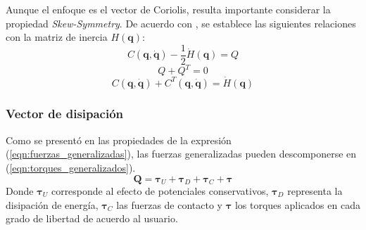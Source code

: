     Aunque el enfoque es el vector de Coriolis, resulta importante considerar la propiedad \emph{Skew-Symmetry}. De acuerdo con \cite{rigid_multibody},
    se establece las siguientes relaciones con la matriz de inercia $H(\boldsymbol{q})$:
    \begin{equation}
        \label{eqn:skew1}
        C(\boldsymbol{q}, \boldsymbol{\dot{q}}) - \frac{1}{2}\dot{H}(\boldsymbol{q}) = Q 
    \end{equation}
    \begin{equation}
        \label{eqn:skew2}
        Q + Q^T = 0
    \end{equation}
    \begin{equation}
        \label{eqn:skew3}
        C(\boldsymbol{q}, \boldsymbol{\dot{q}}) + C^T(\boldsymbol{q}, \boldsymbol{\dot{q}}) = \dot{H}(\boldsymbol{q})
    \end{equation}

    \subsubsection{Vector de disipación}
    Como se presentó en las propiedades de la expresión (\ref{eqn:fuerzas_generalizadas}), las fuerzas generalizadas pueden descomponerse en (\ref{eqn:torques_generalizados}).
    \begin{equation}
        \label{eqn:torques_generalizados}
         \boldsymbol{Q} = \boldsymbol{\tau}_U + \boldsymbol{\tau}_D + \boldsymbol{\tau}_C + \boldsymbol{\tau}
    \end{equation}
    Donde $\boldsymbol{\tau}_U$ corresponde al efecto de potenciales conservativos, $\boldsymbol{\tau}_D$ representa la disipación de energía, $\boldsymbol{\tau}_C$
    las fuerzas de contacto y $\boldsymbol{\tau}$ los torques aplicados en cada grado de libertad de acuerdo al usuario. 
    
